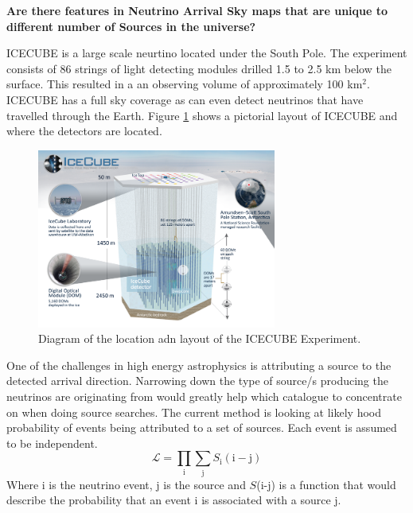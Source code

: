\documentclass[a4paper,12pt,twoside,openright]{article}
\begin{document}
\begin{center}
\huge \textbf{Are there features in Neutrino Arrival Sky maps that are unique to different number of Sources in the universe?}
\end{center}



\normalsize
ICECUBE is a large scale neurtino located under the South Pole. The experiment consists of 86 strings of light detecting modules drilled 1.5 to 2.5 km below the surface. This resulted in a an observing volume of approximately 100 km$^2$. ICECUBE has a full sky coverage as can even detect neutrinos that have travelled through the Earth. Figure \ref{fig:ICECUBE} shows a pictorial layout of ICECUBE and where the detectors are located.

\begin{figure}[h]
\centering
\includegraphics[width=0.7\textwidth]{icecube_detector_sm.png}
\caption{Diagram of the location adn layout of the ICECUBE Experiment.}
\label{fig:ICECUBE}
\end{figure}


One of the challenges in high energy astrophysics is attributing a source to the detected arrival direction. Narrowing down the type of source/s producing the neutrinos are originating from would greatly help which catalogue to concentrate on when doing source searches. The current method is looking at likely hood probability of events being attributed to a set of sources. Each event is assumed to be independent.
\begin{equation}
\mathcal{L} = \prod_{\mathrm{i}} \sum_{\mathrm{j}} S_{\mathrm{i}}(\mathrm{i} - \mathrm{j})
\end{equation}
Where i is the neutrino event, j is the source and $S$(i-j) is a function that would describe the probability that an event i is associated with a source j.
\end{document}
